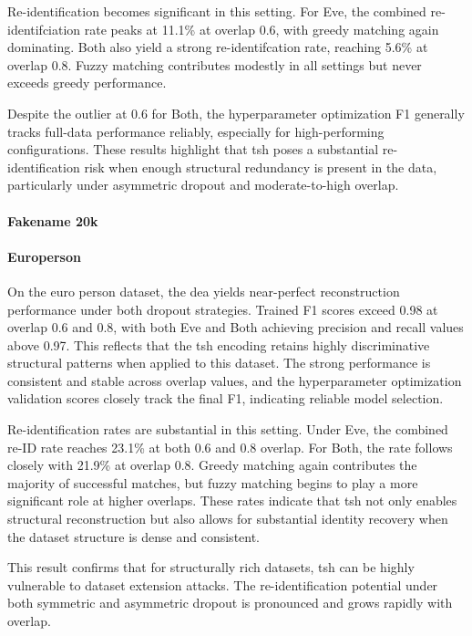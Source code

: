 Re-identification becomes significant in this setting.
For Eve, the combined re-identifciation rate peaks at 11.1\% at overlap 0.6, with greedy matching again dominating.
Both also yield a strong re-identifcation rate, reaching 5.6\% at overlap 0.8.
Fuzzy matching contributes modestly in all settings but never exceeds greedy performance.

Despite the outlier at 0.6 for Both, the hyperparameter optimization F1 generally tracks full-data performance reliably, especially for high-performing configurations.
These results highlight that \ac{tsh} poses a substantial re-identification risk when enough structural redundancy is present in the data, particularly under asymmetric dropout and moderate-to-high overlap.


\paragraph{Fakename 20k}

\paragraph{Europerson}

On the euro person dataset, the \ac{dea} yields near-perfect reconstruction performance under both dropout strategies.
Trained F1 scores exceed 0.98 at overlap 0.6 and 0.8, with both Eve and Both achieving precision and recall values above 0.97.
This reflects that the \ac{tsh} encoding retains highly discriminative structural patterns when applied to this dataset.
The strong performance is consistent and stable across overlap values, and the hyperparameter optimization validation scores closely track the final F1, indicating reliable model selection.

Re-identification rates are substantial in this setting.
Under Eve, the combined re-ID rate reaches 23.1\% at both 0.6 and 0.8 overlap.
For Both, the rate follows closely with 21.9\% at overlap 0.8.
Greedy matching again contributes the majority of successful matches, but fuzzy matching begins to play a more significant role at higher overlaps.
These rates indicate that \ac{tsh} not only enables structural reconstruction but also allows for substantial identity recovery when the dataset structure is dense and consistent.

This result confirms that for structurally rich datasets, \ac{tsh} can be highly vulnerable to dataset extension attacks.
The re-identification potential under both symmetric and asymmetric dropout is pronounced and grows rapidly with overlap.


